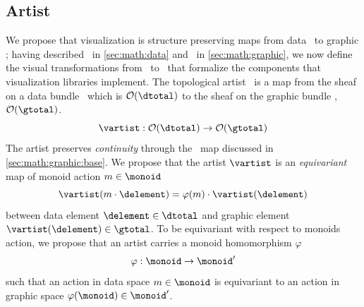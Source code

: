 \documentclass[../main.tex]{subfiles}
\begin{document}
\subsection{Artist}
\label{sec:artist}
We propose that visualization is structure preserving maps from data \dtotal\ to graphic \gtotal; having described \dtotal\ in \autoref{sec:math:data} and \gtotal\ in \autoref{sec:math:graphic}, we now define the visual transformations from \dtotal\ to \gtotal\ that formalize the components that visualization libraries implement. The topological artist \vartist\ is a map from the sheaf on a data bundle \dtotal\ which is \(\mathcal{O}(\dtotal)\) to the sheaf on the graphic bundle \gtotal, \(\mathcal{O}(\gtotal)\). 
\begin{equation}
    \vartist: \mathcal{O}(\dtotal) \rightarrow \mathcal{O}(\gtotal)
    \label{eq:math:artist:artist}
\end{equation}
The artist preserves \textit{continuity} through the \vindex\ map discussed in \autoref{sec:math:graphic:base}.  We propose that the artist \(\mathscr{\vartist}\) is an \textit{equivariant} map of monoid action  \(m \in \monoid\)
\begin{equation}
\vartist(m\cdot \delement) = \varphi(m)\cdot \vartist(\delement) 
\end{equation}
between data element \(\delement \in \mathscr{\dtotal}\) and graphic element \(\vartist(\delement) \in \mathscr{\gtotal}\). To be equivariant with respect to monoids action, we propose that an artist carries a monoid homomorphism \(\varphi\)
\begin{equation}
    \varphi: \monoid \rightarrow \monoid^{\prime}
\end{equation}
such that an action in data space \(m \in \monoid\) is equivariant to an action in graphic space \(\varphi(\monoid) \in \monoid^{\prime}\). 
\end{document}

